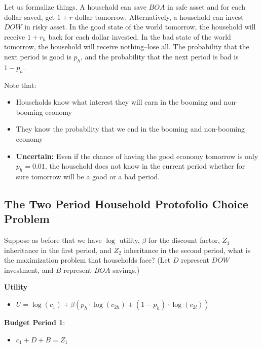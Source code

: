 \documentclass[
]{book}
\providecommand{\tightlist}{%
  \setlength{\itemsep}{0pt}\setlength{\parskip}{0pt}}
\begin{document}
Let us formalize things. A household can save \(BOA\) in safe asset and
for each dollar saved, get \(1+r\) dollar tomorrow. Alternatively, a
household can invest \(DOW\) in risky asset. In the good state of the
world tomorrow, the household will receive \(1+r_h\) back for each dollar
invested. In the bad state of the world tomorrow, the household will
receive nothing--lose all. The probability that the next period is good
is \(p_h\), and the probability that the next period is bad is \(1-p_h\).

Note that:

\begin{itemize}
\item
  Households know what interest they will earn in the booming and
  non-booming economy
\item
  They know the probability that we end in the booming and non-booming
  economy
\item
  \textbf{Uncertain:} Even if the chance of having the good economy
  tomorrow is only \(p_h =0.01\), the household does not know in the
  current period whether for sure tomorrow will be a good or a bad
  period.
\end{itemize}

\hypertarget{the-two-period-household-protofolio-choice-problem}{%
\subsection{The Two Period Household Protofolio Choice Problem}\label{the-two-period-household-protofolio-choice-problem}}

Suppose as before that we have \(\log\) utility, \(\beta\) for the discount
factor, \(Z_1\) inheritance in the first period, and \(Z_2\) inheritance in
the second period, what is the maximization problem that households
face? (Let \(D\) represent \(DOW\) investment, and \(B\) represent \(BOA\)
savings.)

\textbf{Utility}

\begin{itemize}
\tightlist
\item
  \(\displaystyle U=\log (c_1 )+\beta \left(p_h \cdot \log (c_{2h} )+(1-p_h )\cdot \log (c_{2l} )\right)\)
\end{itemize}

\textbf{Budget Period 1}:

\begin{itemize}
\tightlist
\item
  \(\displaystyle c_1 +D+B=Z_1\)
\end{itemize}
\end{document}
